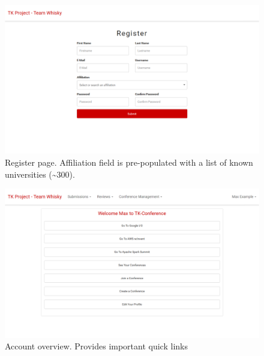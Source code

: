 \documentclass[nochapterpage,nopartpage,noheadingspace,numbersubsubsec,bigchapter,colorback,accentcolor=tud9c,10pt]{tudreport}
\begin{document}
        \begin{figure}[!ht]
            \centering
            \includegraphics[width=\textwidth]{img/ui-register}
            \caption{Register page. Affiliation field is pre-populated with a list of known universities (\textasciitilde300).}
            \label{fig:appendix:screenshots:ui-register}
        \end{figure}

        \begin{figure}[!ht]
            \centering
            \includegraphics[width=\textwidth]{img/ui-account-home}
            \caption{Account overview. Provides important quick links}
            \label{fig:appendix:screenshots:ui-account-home}
        \end{figure}
\end{document}
